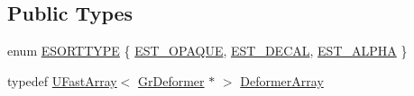 \subsection*{Public Types}
\begin{CompactItemize}
\item 
enum \hyperlink{class_gr_material_0277ae85793f8cce8f8e3939fb5540e9}{ESORTTYPE} \{ \hyperlink{class_gr_material_0277ae85793f8cce8f8e3939fb5540e9436e9e42d8c25cd09c6c644af3555a9d}{EST\_\-OPAQUE}, 
\hyperlink{class_gr_material_0277ae85793f8cce8f8e3939fb5540e995e2b6a86e1a95f130349230b2617099}{EST\_\-DECAL}, 
\hyperlink{class_gr_material_0277ae85793f8cce8f8e3939fb5540e9039f83ee3083c5992195476daad9cfcf}{EST\_\-ALPHA}
 \}
\item 
typedef \hyperlink{class_u_fast_array}{UFastArray}$<$ \hyperlink{class_gr_deformer}{GrDeformer} $\ast$ $>$ \hyperlink{class_gr_material_3c4945ac4c9276c13a3737a9223c479c}{DeformerArray}

\end{CompactItemize}
